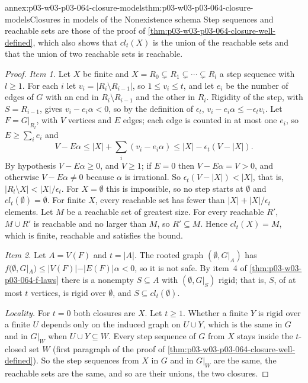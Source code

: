 \begin{annexitem}{annex:p03-w03-p03-064-closure-models}{thm:p03-w03-p03-064-closure-models}{Closures in models of the Nonexistence schema}
Step sequences and reachable sets are those of the proof of
\cref{thm:p03-w03-p03-064-closure-well-defined}, which also shows that
\(cl_t(X)\) is the union of the reachable sets and that the union of two
reachable sets is reachable.
\begin{proof}
\emph{Item 1.}  Let \(X\) be finite and \(X=R_0\subsetneq R_1\subsetneq
\cdots\subsetneq R_l\) a step sequence with \(l\geq1\).  For each \(i\) let
\(v_i=|R_i\setminus R_{i-1}|\), so \(1\leq v_i\leq t\), and let \(e_i\) be the
number of edges of \(G\) with an end in \(R_i\setminus R_{i-1}\) and the other
in \(R_i\).  Rigidity of the step, with \(S=R_{i-1}\), gives
\(v_i-e_i\alpha<0\), so by the definition of \(\epsilon_t\),
\(v_i-e_i\alpha\leq-\epsilon_tv_i\).  Let \(F=G|_{R_l}\), with \(V\)
vertices and \(E\) edges; each edge is counted in at most one \(e_i\), so
\(E\geq\sum_ie_i\) and
\[
  V-E\alpha\leq|X|+\sum_i(v_i-e_i\alpha)\leq|X|-\epsilon_t(V-|X|).
\]
By hypothesis \(V-E\alpha\geq0\), and \(V\geq1\); if \(E=0\) then
\(V-E\alpha=V>0\), and otherwise \(V-E\alpha\neq0\) because \(\alpha\) is
irrational.  So \(\epsilon_t(V-|X|)<|X|\), that is,
\(|R_l\setminus X|<|X|/\epsilon_t\).  For \(X=\emptyset\) this is impossible,
so no step starts at \(\emptyset\) and \(cl_t(\emptyset)=\emptyset\).  For
finite \(X\), every reachable set has fewer than \(|X|+|X|/\epsilon_t\)
elements.  Let \(M\) be a reachable set of greatest size.  For every
reachable \(R'\), \(M\cup R'\) is reachable and no larger than \(M\), so
\(R'\subseteq M\).  Hence \(cl_t(X)=M\), which is finite, reachable and
satisfies the bound.

\emph{Item 2.}  Let \(A=V(F)\) and \(t=|A|\).  The rooted graph
\((\emptyset,G|_A)\) has \(f(\emptyset,G|_A)\leq|V(F)|-|E(F)|\alpha<0\), so it
is not safe.  By item~4 of \cref{thm:p03-w03-p03-064-f-laws} there is a
nonempty \(S\subseteq A\) with \((\emptyset,G|_S)\) rigid; that is, \(S\), of
at most \(t\) vertices, is rigid over \(\emptyset\), and
\(S\subseteq cl_t(\emptyset)\).

\emph{Locality.}  For \(t=0\) both closures are \(X\).  Let \(t\geq1\).
Whether a finite \(Y\) is rigid over a finite \(U\) depends only on the
induced graph on \(U\cup Y\), which is the same in \(G\) and in \(G|_W\) when
\(U\cup Y\subseteq W\).  Every step sequence of \(G\) from \(X\) stays inside
the \(t\)-closed set \(W\) (first paragraph of the proof of
\cref{thm:p03-w03-p03-064-closure-well-defined}).  So the step sequences from
\(X\) in \(G\) and in \(G|_W\) are the same, the reachable sets are the same,
and so are their unions, the two closures.
\end{proof}
\end{annexitem}

